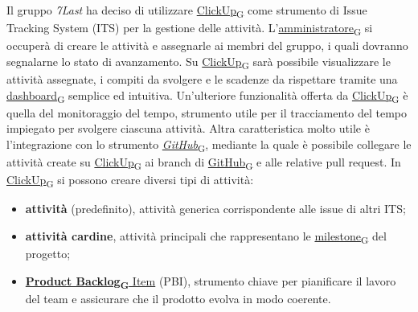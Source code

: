 Il gruppo \textit{7Last} ha deciso di utilizzare \href{https://7last.github.io/docs/pb/documentazione-interna/glossario\#clickup}{ClickUp\textsubscript{G}} come strumento di Issue Tracking System (ITS) per la gestione delle attività. L'\href{https://7last.github.io/docs/pb/documentazione-interna/glossario\#amministratore}{amministratore\textsubscript{G}} si occuperà di creare le attività e assegnarle ai membri del gruppo, i quali dovranno segnalarne lo stato di avanzamento. Su \href{https://7last.github.io/docs/pb/documentazione-interna/glossario\#clickup}{ClickUp\textsubscript{G}} sarà possibile visualizzare le attività assegnate, i compiti da svolgere e le scadenze da rispettare tramite una \href{https://7last.github.io/docs/pb/documentazione-interna/glossario\#dashboard}{dashboard\textsubscript{G}} semplice ed intuitiva. Un'ulteriore funzionalità offerta da \href{https://7last.github.io/docs/pb/documentazione-interna/glossario\#clickup}{ClickUp\textsubscript{G}} è quella del monitoraggio del tempo, strumento utile per il tracciamento del tempo impiegato per svolgere ciascuna attività. Altra caratteristica molto utile è l'integrazione con lo strumento \href{https://7last.github.io/docs/pb/documentazione-interna/glossario\#github}{\textit{GitHub}\textsubscript{G}}, mediante la quale è possibile collegare le attività create su \href{https://7last.github.io/docs/pb/documentazione-interna/glossario\#clickup}{ClickUp\textsubscript{G}} ai branch di \href{https://7last.github.io/docs/pb/documentazione-interna/glossario\#github}{GitHub\textsubscript{G}} e alle relative pull request.
In \href{https://7last.github.io/docs/pb/documentazione-interna/glossario\#clickup}{ClickUp\textsubscript{G}} si possono creare diversi tipi di attività:
\begin{itemize}
    \item \textbf{attività} (predefinito), attività generica corrispondente alle issue di altri ITS;
    \item \textbf{attività cardine}, attività principali che rappresentano le \href{https://7last.github.io/docs/pb/documentazione-interna/glossario\#milestone}{milestone\textsubscript{G}} del progetto;
    \item \href{https://7last.github.io/docs/pb/documentazione-interna/glossario\#product-backlog}{\textbf{Product Backlog\textsubscript{G} }Item} (PBI), strumento chiave per pianificare il lavoro del team e assicurare che il prodotto evolva in modo coerente.
\end{itemize}
